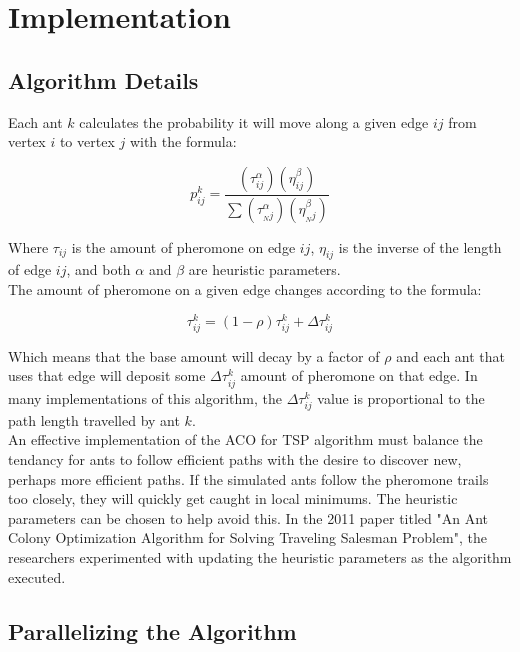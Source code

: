 \documentclass[twocolumn]{article}
\begin{document}
\section{Implementation}

\subsection{Algorithm Details}

Each ant $k$ calculates the probability it will move along a given edge $ij$ 
from vertex $i$ to vertex $j$ with the formula:

{\large\begin{equation}p^k_{ij}=\frac{(\tau^\alpha_{ij})(\eta^\beta_{ij})}
{\sum(\tau^\alpha_{{_N}j})(\eta^\beta_{{_N}j})}\end{equation}} 

Where $\tau_{ij}$ is the amount of pheromone on edge $ij$, $\eta_{ij}$ is the
inverse of the length of edge $ij$, and both {$\alpha$} and {$\beta$} are 
heuristic parameters. \\

The amount of pheromone on a given edge changes according to the formula:

{\large\begin{equation}\tau^k_{ij}=(1-\rho)\tau^k_{ij}+\Delta\tau^k_{ij}
\end{equation}} 

Which means that the base amount will decay by a factor of $\rho$ and each ant
that uses that edge will deposit some $\Delta\tau^k_{ij}$ amount of pheromone on
that edge. In many implementations of this algorithm, the $\Delta\tau^k_{ij}$
value is proportional to the path length travelled by ant $k$. \\

An effective implementation of the ACO for TSP algorithm must balance the 
tendancy for ants to follow efficient paths with the desire to discover new,
perhaps more efficient paths. If the simulated ants follow the pheromone trails
too closely, they will quickly get caught in local minimums. The heuristic 
parameters can be chosen to help avoid this. In the 2011 paper titled "An Ant
Colony Optimization Algorithm for Solving Traveling Salesman Problem", the 
researchers experimented with updating the heuristic parameters as the algorithm
executed. \\

\subsection{Parallelizing the Algorithm}
\end{document}
